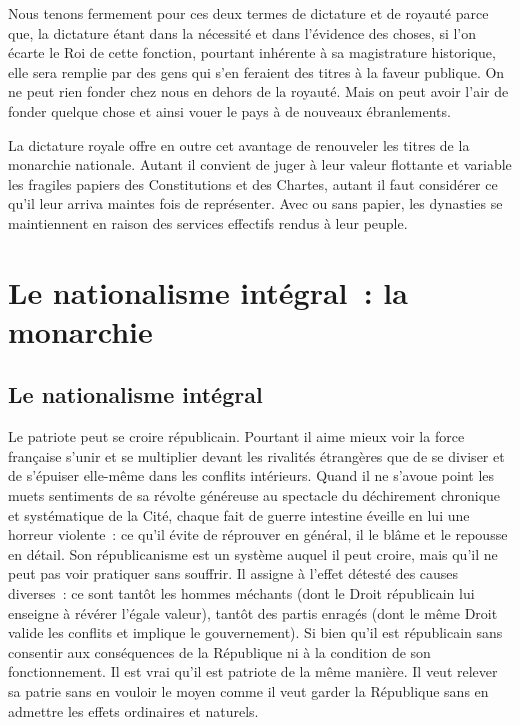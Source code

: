 \documentclass[french,twoside]{book} %
\newcommand{\astermono}{\medskip\centerline{\color{rubric}\large\selectfont{\syms ✻}}\medskip\par}%
\begin{document}
\astermono

\noindent Nous tenons fermement pour ces deux termes de dictature et de royauté parce que, la dictature étant dans la nécessité et dans l’évidence des choses, si l’on écarte le Roi de cette fonction, pourtant inhérente à sa magistrature historique, elle sera remplie par des gens qui s’en feraient des titres à la faveur publique. On ne peut rien fonder chez nous en dehors de la royauté. Mais on peut avoir l’air de fonder quelque chose et ainsi vouer le pays à de nouveaux ébranlements.\par
La dictature royale offre en outre cet avantage de renouveler les titres de la monarchie nationale. Autant il convient de juger à leur valeur flottante et variable les fragiles papiers des Constitutions et des Chartes, autant il faut considérer ce qu’il leur arriva maintes fois de représenter. Avec ou sans papier, les dynasties se maintiennent en raison des services effectifs rendus à leur peuple.
\section[Le nationalisme intégral : la monarchie]{Le nationalisme intégral : la monarchie}
\subsection[Le nationalisme intégral]{Le nationalisme intégral}
\noindent Le patriote peut se croire républicain. Pourtant il aime mieux voir la force française s’unir et se multiplier devant les rivalités étrangères que de se diviser et de s’épuiser elle-même dans les conflits intérieurs. Quand il ne s’avoue point les muets sentiments de sa révolte généreuse au spectacle du déchirement chronique et systématique de la Cité, chaque fait de guerre intestine éveille en lui une horreur violente : ce qu’il évite de réprouver en général, il le blâme et le repousse en détail. Son républicanisme est un système auquel il peut croire, mais qu’il ne peut pas voir pratiquer sans souffrir. Il assigne à l’effet détesté des causes diverses : ce sont tantôt les hommes méchants (dont le Droit républicain lui enseigne à révérer l’égale valeur), tantôt des partis enragés (dont le même Droit valide les conflits et implique le gouvernement). Si bien qu’il est républicain sans consentir aux conséquences de la République ni à la condition de son fonctionnement. Il est vrai qu’il est patriote de la même manière. Il veut relever sa patrie sans en vouloir le moyen comme il veut garder la République sans en admettre les effets ordinaires et naturels.\par
\end{document}
